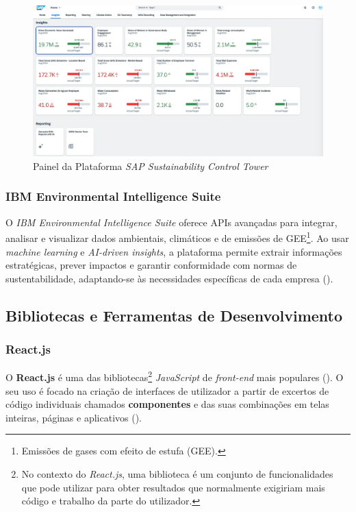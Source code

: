 \begin{figure}[h]
    \centering
    \includegraphics[width=5.75in]{frontmatter/assets/SAP.png}
    \caption{Painel da Plataforma \textit{SAP Sustainability Control Tower}}
    \label{fig:sap_sustainability_control_tower}
\end{figure}

\subsubsection{IBM Environmental Intelligence Suite}

O \textit{IBM Environmental Intelligence Suite} oferece APIs avançadas para integrar, analisar e visualizar dados ambientais, climáticos e de emissões de GEE\footnote{Emissões de gases com efeito de estufa (GEE).}. Ao usar \textit{machine learning} e \textit{AI-driven insights}, a plataforma permite extrair informações estratégicas, prever impactos e garantir conformidade com normas de sustentabilidade, adaptando-se às necessidades específicas de cada empresa (\cite{IBM2025}).

\subsection{Bibliotecas e Ferramentas de Desenvolvimento}
\label{subsec: BFD}

\subsubsection{React.js}

O \textbf{React.js} é uma das bibliotecas\footnote{No contexto do \textit{React.js}, uma biblioteca é um conjunto de funcionalidades que pode utilizar para obter resultados que normalmente exigiriam mais código e trabalho da parte do utilizador.} \textit{JavaScript} de \textit{front-end} mais populares (\cite{Schwarzmuller2022}). O seu uso é focado na criação de interfaces de utilizador a partir de excertos de código individuais chamados \textbf{componentes} e das suas combinações em telas inteiras, páginas e aplicativos (\cite{React2025}).

